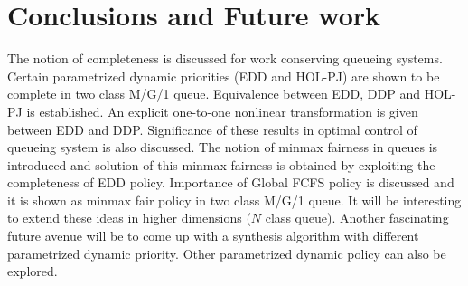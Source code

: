 \documentclass[letterpaper, 10 pt, conference]{ieeeconf}  %
\begin{document}
\section{Conclusions and Future work}
The notion of completeness is discussed for work conserving queueing systems. Certain parametrized dynamic priorities (EDD and HOL-PJ) are shown to be complete in two class M/G/1 queue. Equivalence between EDD, DDP and HOL-PJ is established. An explicit one-to-one nonlinear transformation is given between EDD and DDP. Significance of these results in optimal control of queueing system is also discussed. The notion of minmax fairness in queues is introduced and solution of this minmax fairness is obtained by exploiting the completeness of EDD policy. Importance of Global FCFS policy is discussed and it is shown as minmax fair policy in two class M/G/1 queue. It will be interesting to extend these ideas in higher dimensions ($N$ class queue). Another fascinating future avenue will be to come up with a synthesis algorithm with different parametrized dynamic priority. Other parametrized dynamic policy can also be explored.   %
\label{sec:conclusion}
\end{document}
